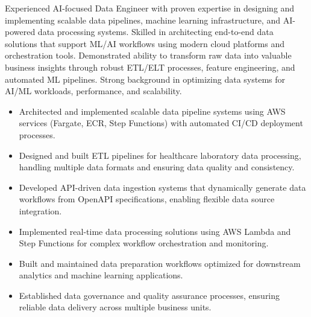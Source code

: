 \documentclass[10pt,a4paper,ragged2e,withhyper]{altacv}
\begin{document}
\makecvheader %

\begin{minipage}{\textwidth}
Experienced AI-focused Data Engineer with proven expertise in designing and implementing scalable data pipelines, machine learning infrastructure, and AI-powered data processing systems. Skilled in architecting end-to-end data solutions that support ML/AI workflows using modern cloud platforms and orchestration tools. Demonstrated ability to transform raw data into valuable business insights through robust ETL/ELT processes, feature engineering, and automated ML pipelines. Strong background in optimizing data systems for AI/ML workloads, performance, and scalability.
\end{minipage}

\begin{itemize}[noitemsep]
\item Architected and implemented scalable data pipeline systems using AWS services (Fargate, ECR, Step Functions) with automated CI/CD deployment processes.
\item Designed and built ETL pipelines for healthcare laboratory data processing, handling multiple data formats and ensuring data quality and consistency.
\item Developed API-driven data ingestion systems that dynamically generate data workflows from OpenAPI specifications, enabling flexible data source integration.
\item Implemented real-time data processing solutions using AWS Lambda and Step Functions for complex workflow orchestration and monitoring.
\item Built and maintained data preparation workflows optimized for downstream analytics and machine learning applications.
\item Established data governance and quality assurance processes, ensuring reliable data delivery across multiple business units.
\end{itemize}
\end{document}
